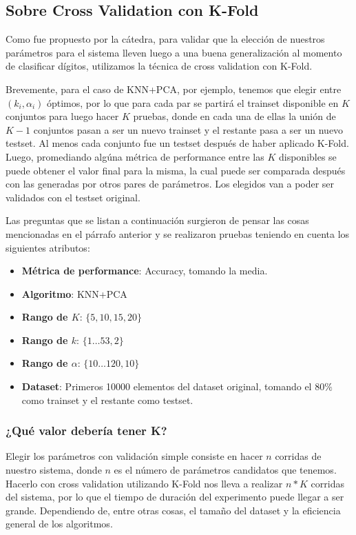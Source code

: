 \subsection{Sobre Cross Validation con K-Fold}

Como fue propuesto por la cátedra, para validar que la elección de nuestros parámetros para el sistema lleven luego a una buena generalización al momento de clasificar dígitos, utilizamos la técnica de cross validation con K-Fold.

Brevemente, para el caso de KNN+PCA, por ejemplo, tenemos que elegir entre $(k_i, \alpha_i)$ óptimos, por lo que para cada par se partirá el trainset disponible en $K$ conjuntos para luego hacer $K$ pruebas, donde en cada una de ellas la unión de $K-1$ conjuntos pasan a ser un nuevo trainset y el restante pasa a ser un nuevo testset. Al menos cada conjunto fue un testset después de haber aplicado K-Fold. Luego, promediando algúna métrica de performance entre las $K$ disponibles se puede obtener el valor final para la misma, la cual puede ser comparada después con las generadas por otros pares de parámetros. Los elegidos van a poder ser validados con el testset original.

Las preguntas que se listan a continuación surgieron de pensar las cosas mencionadas en el párrafo anterior y se realizaron pruebas teniendo en cuenta los siguientes atributos:

\begin{itemize}
    \item \textbf{Métrica de performance}: Accuracy, tomando la media.
    \item \textbf{Algoritmo}: KNN+PCA
    \item \textbf{Rango de $K$}: $\{5, 10, 15, 20\}$
    \item \textbf{Rango de $k$}: $\{1\dots53, 2\}$
    \item \textbf{Rango de $\alpha$}: $\{10\dots120, 10\}$
    \item \textbf{Dataset}: Primeros 10000 elementos del dataset original, tomando el $80\%$ como trainset y el restante como testset.
\end{itemize}

\subsubsection{¿Qué valor debería tener K?}\label{KFoldValueK}

Elegir los parámetros con validación simple consiste en hacer $n$ corridas de nuestro sistema, donde $n$ es el número de parámetros candidatos que tenemos. Hacerlo con cross validation utilizando K-Fold nos lleva a realizar $n * K$ corridas del sistema, por lo que el tiempo de duración del experimento puede llegar a ser grande. Dependiendo de, entre otras cosas, el tamaño del dataset y la eficiencia general de los algoritmos.

